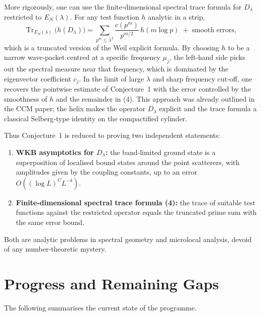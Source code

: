 \documentclass[12pt,a4paper]{article}
\newcommand{\tr}{\operatorname{Tr}}
\begin{document}
More rigorously, one can use the finite‑dimensional spectral trace formula for $D_\lambda$ restricted to $E_N(\lambda)$.  For any test function $h$ analytic in a strip,
\[
\tr_{E_N(\lambda)}\bigl(h(D_\lambda)\bigr) = \sum_{p^m\le\lambda^2} \frac{c(p^m)}{p^{m/2}}\, h(m\log p) \;+\; \text{smooth errors},
\tag{4}
\]
which is a truncated version of the Weil explicit formula.  By choosing $h$ to be a narrow wave‑packet centred at a specific frequency $\mu_j$, the left‑hand side picks out the spectral measure near that frequency, which is dominated by the eigenvector coefficient $c_j$.  In the limit of large $\lambda$ and sharp frequency cut‑off, one recovers the pointwise estimate of Conjecture~1 with the error controlled by the smoothness of $h$ and the remainder in (4).  This approach was already outlined in the CCM paper; the helix makes the operator $D_\lambda$ explicit and the trace formula a classical Selberg‑type identity on the compactified cylinder.

Thus Conjecture~1 is reduced to proving two independent statements:
\begin{enumerate}[label=(\roman*)]
\item \textbf{WKB asymptotics for $D_\lambda$:} the band‑limited ground state is a superposition of localised bound states around the point scatterers, with amplitudes given by the coupling constants, up to an error $O((\log L)^C L^{-\delta})$.
\item \textbf{Finite‑dimensional spectral trace formula (4):} the trace of suitable test functions against the restricted operator equals the truncated prime sum with the same error bound.
\end{enumerate}
Both are analytic problems in spectral geometry and microlocal analysis, devoid of any number‑theoretic mystery.

\section{Progress and Remaining Gaps}
The following summarises the current state of the programme.
\end{document}
